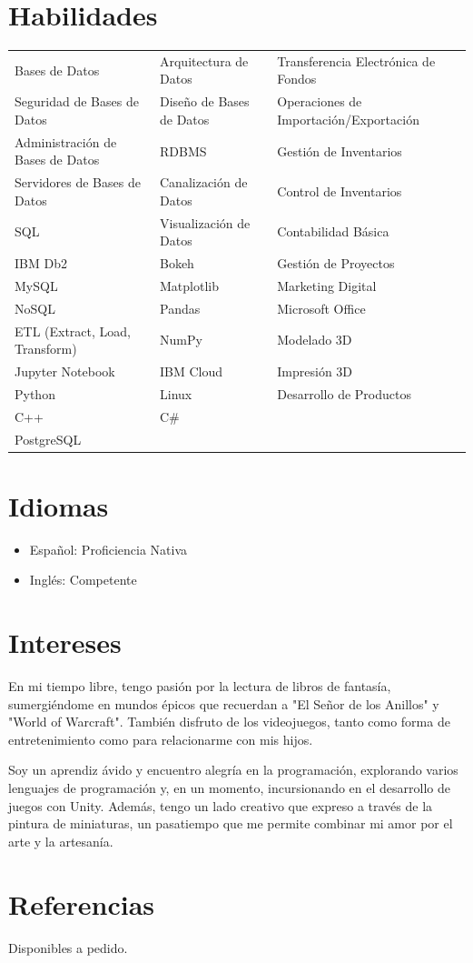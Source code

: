 \documentclass[a4paper,10pt]{article}
\begin{document}
\section*{Habilidades}
\begin{tabular}{p{4.5cm}p{4.5cm}p{4.5cm}}
    Bases de Datos & Arquitectura de Datos & Transferencia Electrónica de Fondos \\
    Seguridad de Bases de Datos & Diseño de Bases de Datos & Operaciones de Importación/Exportación \\
    Administración de Bases de Datos & RDBMS & Gestión de Inventarios \\
    Servidores de Bases de Datos & Canalización de Datos & Control de Inventarios \\
    SQL & Visualización de Datos & Contabilidad Básica \\
    IBM Db2 & Bokeh & Gestión de Proyectos \\
    MySQL & Matplotlib & Marketing Digital \\
    NoSQL & Pandas & Microsoft Office \\
    ETL (Extract, Load, Transform) & NumPy & Modelado 3D \\
    Jupyter Notebook & IBM Cloud & Impresión 3D \\
    Python & Linux & Desarrollo de Productos \\
    C++ & C\# & \\
    PostgreSQL & & \\
\end{tabular}

\section*{Idiomas}
\begin{itemize}
    \item Español: Proficiencia Nativa
    \item Inglés: Competente
\end{itemize}

\section*{Intereses}
En mi tiempo libre, tengo pasión por la lectura de libros de fantasía, sumergiéndome en mundos épicos que recuerdan a "El Señor de los Anillos" y "World of Warcraft". También disfruto de los videojuegos, tanto como forma de entretenimiento como para relacionarme con mis hijos.

Soy un aprendiz ávido y encuentro alegría en la programación, explorando varios lenguajes de programación y, en un momento, incursionando en el desarrollo de juegos con Unity. Además, tengo un lado creativo que expreso a través de la pintura de miniaturas, un pasatiempo que me permite combinar mi amor por el arte y la artesanía.

\section*{Referencias}
Disponibles a pedido.
\end{document}
